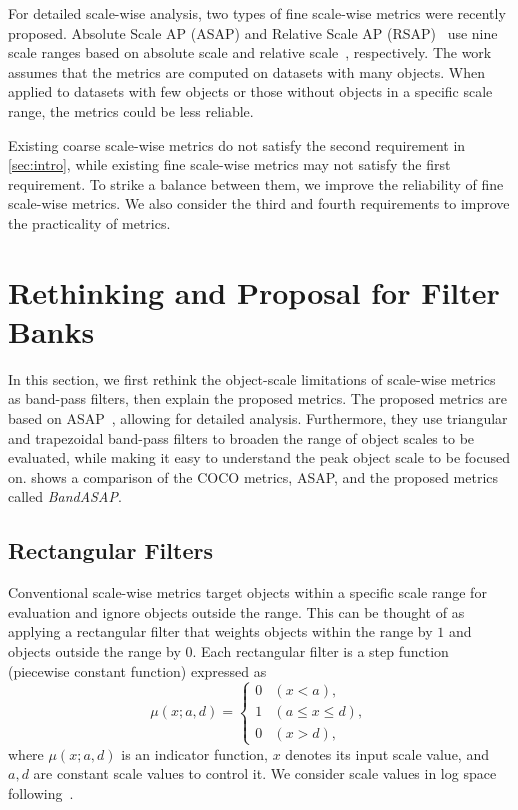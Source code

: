 \documentclass{mva_style}
\begin{document}
For detailed scale-wise analysis, two types of fine scale-wise metrics were recently proposed.
Absolute Scale AP (ASAP) and Relative Scale AP (RSAP)~\cite{USB_Shinya_BMVC2022} use nine scale ranges based on absolute scale and relative scale~\cite{TinyPerson_WACV2020}, respectively.
The work assumes that the metrics are computed on datasets with many objects.
When applied to datasets with few objects or those without objects in a specific scale range, the metrics could be less reliable.

Existing coarse scale-wise metrics do not satisfy the second requirement in \cref{sec:intro},
while existing fine scale-wise metrics may not satisfy the first requirement.
To strike a balance between them, we improve the reliability of fine scale-wise metrics.
We also consider the third and fourth requirements to improve the practicality of metrics.







\section{Rethinking and Proposal for Filter Banks}
\label{sec:proposed_metrics}

In this section, we first rethink the object-scale limitations of scale-wise metrics as band-pass filters, then explain the proposed metrics.
The proposed metrics are based on ASAP~\cite{USB_Shinya_BMVC2022}, allowing for detailed analysis.
Furthermore, they use triangular and trapezoidal band-pass filters to broaden the range of object scales to be evaluated, while making it easy to understand the peak object scale to be focused on.
 shows a comparison of the COCO metrics, ASAP, and the proposed metrics called \textit{BandASAP}.


\subsection{Rectangular Filters}

Conventional scale-wise metrics target objects within a specific scale range for evaluation and ignore objects outside the range.
This can be thought of as applying a rectangular filter that weights objects within the range by $1$ and objects outside the range by $0$.
Each rectangular filter is a step function (piecewise constant function) expressed as
\begin{equation} \label{eq:rectangular_filter}
	\mu(x; a, d) =
	\begin{cases}
		0 & (x < a),           \\
		1 & (a \leq x \leq d), \\
		0 & (x > d),
	\end{cases}
\end{equation}
where $\mu(x; a, d)$ is an indicator function,
$x$ denotes its input scale value,
and $a, d$ are constant scale values to control it.
We consider scale values in log space following~\cite{Caltech_PAMI2012}.
\end{document}
